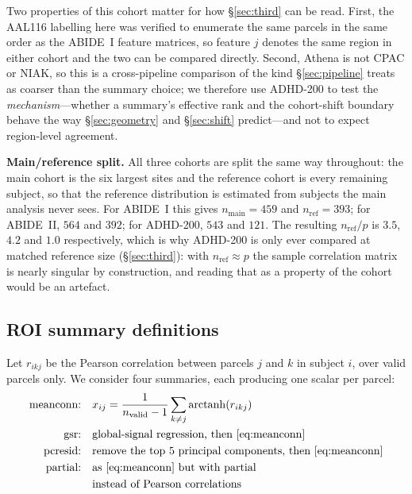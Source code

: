 \documentclass[11pt,a4paper]{article}
\begin{document}
Two properties of this cohort matter for how \S\ref{sec:third} can be read.
First, the AAL116 labelling here was verified to enumerate the same parcels
in the same order as the ABIDE~I feature matrices, so feature $j$ denotes
the same region in either cohort and the two can be compared directly.
Second, Athena is not CPAC or NIAK, so this is a cross-pipeline comparison of
the kind \S\ref{sec:pipeline} treats as coarser than the summary choice; we
therefore use ADHD-200 to test the \emph{mechanism}---whether a summary's
effective rank and the cohort-shift boundary behave the way
\S\ref{sec:geometry} and \S\ref{sec:shift} predict---and not to expect
region-level agreement.

\textbf{Main/reference split.} All three cohorts are split the same way
throughout: the main cohort is the six largest sites and the reference cohort
is every remaining subject, so that the reference distribution is estimated
from subjects the main analysis never sees. For ABIDE~I this gives
$n_{\mathrm{main}}=459$ and $n_{\mathrm{ref}}=393$; for ABIDE~II, $564$ and
$392$; for ADHD-200, $543$ and $121$. The resulting $n_{\mathrm{ref}}/p$ is
$3.5$, $4.2$ and $1.0$ respectively, which is why ADHD-200 is only ever
compared at matched reference size (\S\ref{sec:third}): with
$n_{\mathrm{ref}}\approx p$ the sample correlation matrix is nearly singular
by construction, and reading that as a property of the cohort would be an
artefact.

\subsection{ROI summary definitions}
\label{sec:features}

Let $r_{ikj}$ be the Pearson correlation between parcels $j$ and $k$ in
subject $i$, over valid parcels only. We consider four summaries, each
producing one scalar per parcel:
\begin{align}
  \text{meanconn:}\quad & x_{ij}=\frac{1}{n_{\mathrm{valid}}-1}
    \sum_{k\ne j}\operatorname{arctanh}(r_{ikj})
    \label{eq:meanconn}\\
  \text{gsr:}\quad & \text{global-signal regression, then
    \eqref{eq:meanconn}} \label{eq:gsr}\\
  \text{pcresid:}\quad & \text{remove the top $5$ principal components, then
    \eqref{eq:meanconn}} \label{eq:pcresid}\\
  \text{partial:}\quad & \text{as \eqref{eq:meanconn} but with partial}
    \nonumber\\
  & \text{instead of Pearson correlations}
    \label{eq:partial}
\end{align}
\end{document}
